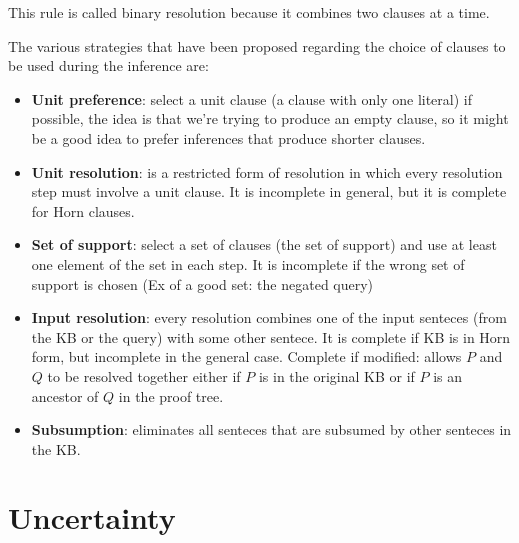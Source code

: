 \documentclass[12pt]{article}
\begin{document}
\begin{enumerate}[label=\textbf{FOL.\arabic*}]
    This rule is called binary resolution because it combines two clauses at a time.

    The various strategies that have been proposed regarding the choice of clauses to be used during the inference are:
    \begin{itemize}
        \item \textbf{Unit preference}: select a unit clause (a clause with only one literal) if possible, the idea is that we're trying to produce an empty clause, so it might be a good idea to prefer inferences that produce shorter clauses.
        \item \textbf{Unit resolution}: is a restricted form of resolution in which every resolution step must involve a unit clause.
        It is incomplete in general, but it is complete for Horn clauses.
        \item \textbf{Set of support}: select a set of clauses (the set of support) and use at least one element of the set in each step.
        It is incomplete if the wrong set of support is chosen (Ex of a good set: the negated query)
        \item \textbf{Input resolution}: every resolution combines one of the input senteces (from the KB or the query) with some other sentece.
        It is complete if KB is in Horn form, but incomplete in the general case. 
        Complete if modified: allows $P$ and $Q$ to be resolved together either if $P$ is in the original KB or if $P$ is an ancestor of $Q$ in the proof tree.
        \item \textbf{Subsumption}: eliminates all senteces that are subsumed by other senteces in the KB\@.
    \end{itemize}

\end{enumerate}

\section{Uncertainty}
\end{document}
